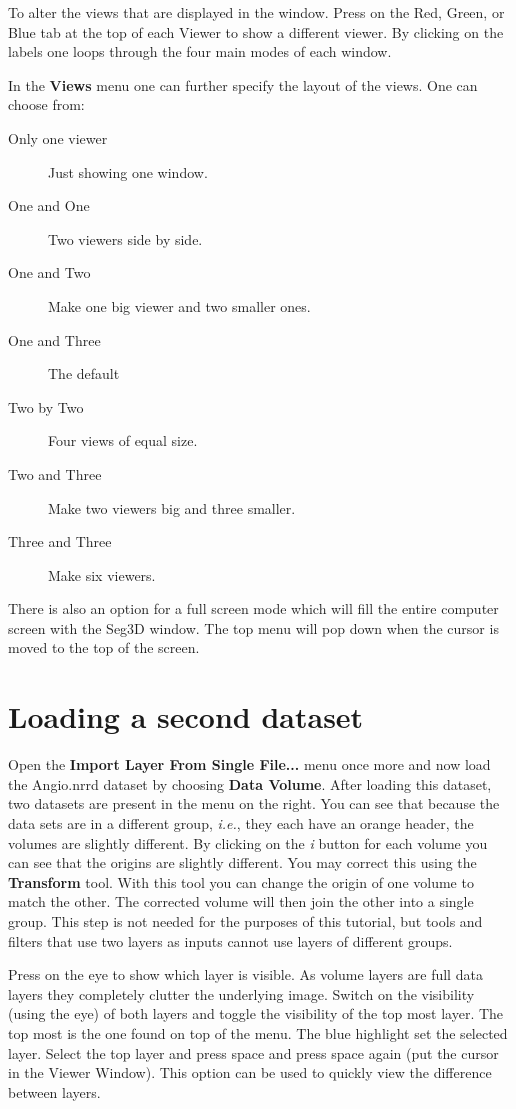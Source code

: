 \documentclass[fleqn,11pt,openany]{book}
\begin{document}
To alter the views that are displayed in the window. Press on the Red, Green, or Blue tab at the top of each Viewer to show a different viewer. By clicking on the labels one loops through the four main modes of each window.

In the {\bf Views} menu one can further specify the layout of the views. One can choose from:

\begin{description}
\item[Only one viewer] Just showing one window.
\item[One and One] Two viewers side by side.
\item[One and Two] Make one big viewer and two smaller ones.
\item[One and Three] The default
\item[Two by Two]  Four views of equal size.
\item[Two and Three] Make two viewers big and three smaller.
\item[Three and Three] Make six viewers.
\end{description}


There is also an option for a full screen mode which will fill the entire computer screen with the Seg3D window. The top menu will pop down when the cursor is moved to the top of the screen.

\section{Loading a second dataset}

Open the {\bf Import Layer From Single File...} menu once more and now load the Angio.nrrd dataset by choosing \textbf {Data Volume}.
After loading this dataset, two datasets are present in the menu on the right.  You can see that because the data sets are in a different group, \emph{i.e.}, they each have an orange header, the volumes are slightly different.  By clicking on the \emph{i} button for each volume you can see that the origins are slightly different.  You may correct this using the {\bf Transform} tool.  With this tool you can change the origin of one volume to match the other. The corrected volume will then join the other into a single group. This step is not needed for  the purposes of this tutorial, but tools and filters that use two layers as inputs cannot use layers of different groups.  

Press on the eye to show which layer is visible. As volume layers are full data layers they completely clutter the underlying image.
Switch on the visibility (using the eye) of both layers and toggle the visibility of the top most layer.  The top most is the one found on top of the menu. 
The blue highlight set the selected layer.  Select the top layer and press space and press space again (put the cursor in the Viewer Window).
This option can be used to quickly view the difference between layers.
\end{document}
